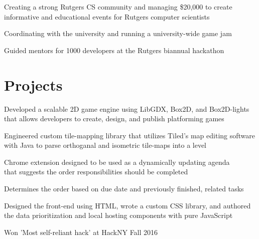 \documentclass[]{deedy-resume-openfont}
\begin{document}
\begin{minipage}[t]{0.66\textwidth}
\begin{tightemize}
\item Creating a strong Rutgers CS community and managing \$20,000 to create informative and educational events for Rutgers computer scientists
\item Coordinating with the university and running a university-wide  game jam
\item Guided mentors for 1000 developers at the Rutgers biannual hackathon
\end{tightemize}
\sectionsep


\section{Projects}
\begin{tightemize}
\item Developed a scalable 2D game engine using LibGDX, Box2D, and Box2D-lights that allows developers to create, design, and publish platforming games
\item Engineered custom tile-mapping library that utilizes  Tiled's map editing software with Java to parse orthoganal and isometric tile-maps into a level   
\end{tightemize}
\sectionsep

\begin{tightemize}
\item Chrome extension designed to be used as a dynamically updating agenda \\that suggests the order responsibilities should be completed 
\item Determines the order based on due date and previously finished, related tasks
\item Designed the front-end using HTML, wrote a custom CSS library, and authored \\the data prioritization and local hosting components with pure JavaScript 
\item Won 'Most self-reliant hack' at HackNY Fall 2016
\end{tightemize}
\sectionsep


\end{minipage}
\end{document}
